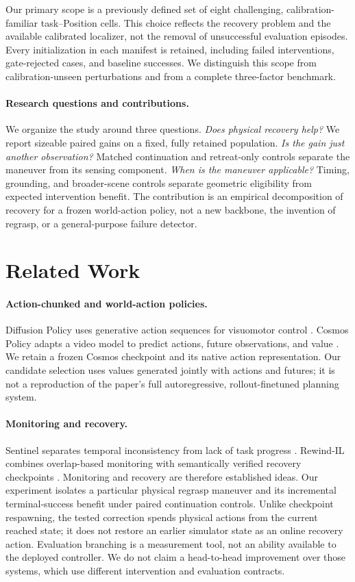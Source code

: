 \documentclass{article}
\begin{document}
Our primary scope is a previously defined set of eight challenging,
calibration-familiar task--Position cells. This choice reflects the recovery
problem and the available calibrated localizer, not the removal of unsuccessful
evaluation episodes. Every initialization in each manifest is retained,
including failed interventions, gate-rejected cases, and baseline successes.
We distinguish this scope from calibration-unseen perturbations and from a
complete three-factor benchmark.

\paragraph{Research questions and contributions.}
We organize the study around three questions. \emph{Does physical recovery
help?} We report sizeable paired gains on a fixed, fully retained population.
\emph{Is the gain just another observation?} Matched continuation and
retreat-only controls separate the maneuver from its sensing component.
\emph{When is the maneuver applicable?} Timing, grounding, and broader-scene
controls separate geometric eligibility from expected intervention benefit.
The contribution is an empirical decomposition of recovery for a frozen
world-action policy, not a new backbone, the invention of regrasp, or a
general-purpose failure detector.

\section{Related Work}
\paragraph{Action-chunked and world-action policies.}
Diffusion Policy uses generative action sequences for visuomotor control
\citep{diffusion_policy}. Cosmos Policy adapts a video model to predict
actions, future observations, and value \citep{cosmos_policy}.
We retain a frozen Cosmos checkpoint and its native action representation.
Our candidate selection uses values generated jointly with actions and futures;
it is not a reproduction of the paper's full autoregressive,
rollout-finetuned planning system.

\paragraph{Monitoring and recovery.}
Sentinel separates temporal inconsistency from lack of task progress
\citep{sentinel}. Rewind-IL combines overlap-based monitoring with
semantically verified recovery checkpoints \citep{rewind_il}.
Monitoring and recovery are therefore established ideas.
Our experiment isolates a particular physical regrasp maneuver and its
incremental terminal-success benefit under paired continuation controls.
Unlike checkpoint respawning, the tested correction spends physical actions
from the current reached state; it does not restore an earlier simulator
state as an online recovery action. Evaluation branching is a measurement
tool, not an ability available to the deployed controller.
We do not claim a head-to-head improvement over those systems, which use
different intervention and evaluation contracts.
\end{document}
